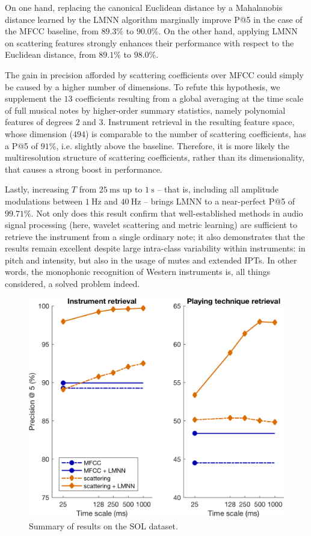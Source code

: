 \documentclass{article}
\makeatletter
\newcommand*{\ie}{i.e.\@\xspace}
\makeatother
\begin{document}
On one hand, replacing the canonical Euclidean distance by a Mahalanobis distance learned by the LMNN algorithm marginally improve P@5 in the case of the MFCC baseline, from $89.3\%$ to $90.0\%$.
On the other hand, applying LMNN on scattering features strongly enhances their performance with respect to the Euclidean distance, from $89.1\%$ to $98.0\%$.

The gain in precision afforded by scattering coefficients over MFCC could simply be caused by a higher number of dimensions.
To refute this hypothesis, we supplement the $13$ coefficients resulting from a global averaging at the time scale of full musical notes by higher-order summary statistics, namely polynomial features of degrees $2$ and $3$.
Instrument retrieval in the resulting feature space, whose dimension ($494$) is comparable to the number of scattering coefficients, has a P@5 of $91\%$, \ie{} slightly above the baseline.
Therefore, it is more likely the multiresolution structure of scattering coefficients, rather than its dimensionality, that causes a strong boost in performance.

Lastly, increasing $T$ from $\SI{25}{\milli\second}$ up to $\SI{1}{\second}$ -- that is, including all amplitude modulations between $\SI{1}{\Hz}$ and $\SI{40}{\Hz}$ -- brings LMNN to a near-perfect P@5 of $99.71\%$.
Not only does this result confirm that well-established methods in audio signal processing (here, wavelet scattering and metric learning) are sufficient to retrieve the instrument from a single ordinary note; it also demonstrates that the results remain excellent despite large intra-class variability within instruments: in pitch and intensity, but also in the usage of mutes and extended IPTs.
In other words, the monophonic recognition of Western instruments is, all things considered, a solved problem indeed. 

\begin{figure}
\includegraphics[width=\linewidth,keepaspectratio]{./figs/results/results.png}
\caption{Summary of results on the SOL dataset.}
\label{fig:results}
\end{figure}
\end{document}
